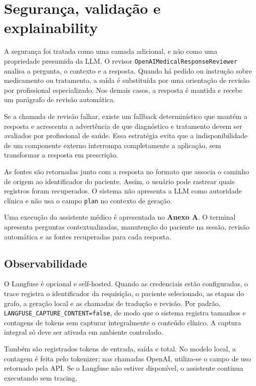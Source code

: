 \documentclass[12pt,a4paper]{article}
\begin{document}
\section{Segurança, validação e explainability}

A segurança foi tratada como uma camada adicional, e não como uma propriedade presumida da LLM. O revisor \texttt{OpenAIMedicalResponseReviewer} analisa a pergunta, o contexto e a resposta. Quando há pedido ou instrução sobre medicamento ou tratamento, a saída é substituída por uma orientação de revisão por profissional especializado. Nos demais casos, a resposta é mantida e recebe um parágrafo de revisão automática.

Se a chamada de revisão falhar, existe um fallback determinístico que mantém a resposta e acrescenta a advertência de que diagnóstico e tratamento devem ser avaliados por profissional de saúde. Essa estratégia evita que a indisponibilidade de um componente externo interrompa completamente a aplicação, sem transformar a resposta em prescrição.

As fontes são retornadas junto com a resposta no formato que associa o caminho de origem ao identificador do paciente. Assim, o usuário pode rastrear quais registros foram recuperados. O sistema não apresenta a LLM como autoridade clínica e não usa o campo \texttt{plan} no contexto de geração.

Uma execução do assistente médico é apresentada no \textbf{Anexo A}. O terminal apresenta perguntas contextualizadas, manutenção do paciente na sessão, revisão automática e as fontes recuperadas para cada resposta.

\subsection{Observabilidade}

O Langfuse é opcional e self-hosted. Quando as credenciais estão configuradas, o trace registra o identificador da requisição, o paciente selecionado, as etapas do grafo, a geração local e as chamadas de tradução e revisão. Por padrão, \texttt{LANGFUSE\_CAPTURE\_CONTENT=false}, de modo que o sistema registra tamanhos e contagens de tokens sem capturar integralmente o conteúdo clínico. A captura integral só deve ser ativada em ambiente controlado.

Também são registrados tokens de entrada, saída e total. No modelo local, a contagem é feita pelo tokenizer; nas chamadas OpenAI, utiliza-se o campo de uso retornado pela API. Se o Langfuse não estiver disponível, o assistente continua executando sem tracing.
\end{document}
